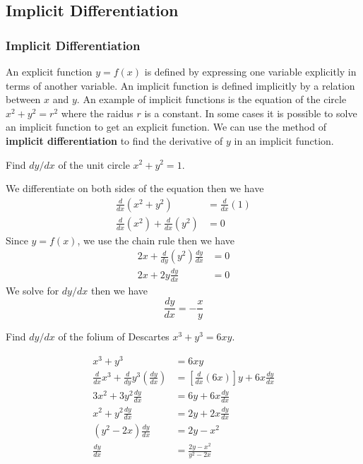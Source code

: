 \subsection{Implicit Differentiation}

\subsubsection*{Implicit Differentiation}
An explicit function \(y=f(x)\) is defined by expressing one variable
explicitly in terms of another variable.
An implicit function is defined implicitly by a relation between \(x\) and
\(y\).
An example of implicit functions is the equation of the circle \(x^2+y^2=r^2\)
where the raidus \(r\) is a constant.
In some cases it is possible to solve an implicit function to get an explicit function.
We can use the method of \textbf{implicit differentiation} to find the derivative
of \(y\) in an implicit function.
\begin{problem}
    Find \(dy/dx\) of the unit circle \(x^2+y^2=1\).
\end{problem}
\begin{solution}
    We differentiate on both sides of the equation then we have
    \begin{align*}
        \frac{d}{dx}(x^2+y^2) &= \frac{d}{dx}(1) \\
        \frac{d}{dx}(x^2)+\frac{d}{dx}(y^2) &= 0
    \end{align*}
    Since \(y=f(x)\), we use the chain rule then we have
    \begin{align*}
        2x+\frac{d}{dy}(y^2)\frac{dy}{dx} &= 0 \\
        2x+2y\frac{dy}{dx} &= 0
    \end{align*}
    We solve for \(dy/dx\) then we have
    \[\frac{dy}{dx}=-\frac{x}{y}\]
\end{solution}
\begin{problem}
    Find \(dy/dx\) of the folium of Descartes \(x^3+y^3=6xy\).
\end{problem}
\begin{solution}
    \begin{align*}
        x^3+y^3 &= 6xy \\
        \frac{d}{dx}x^3+\frac{d}{dy}y^3\left(\frac{dy}{dx}\right)
        &= \left[\frac{d}{dx}(6x)\right]y+6x\frac{dy}{dx} \\
        3x^2+3y^2\frac{dy}{dx} &= 6y+6x\frac{dy}{dx} \\
        x^2+y^2\frac{dy}{dx} &= 2y+2x\frac{dy}{dx} \\
        (y^2-2x)\frac{dy}{dx} &= 2y-x^2 \\
        \frac{dy}{dx} &= \frac{2y-x^2}{y^2-2x} 
    \end{align*}
\end{solution}
